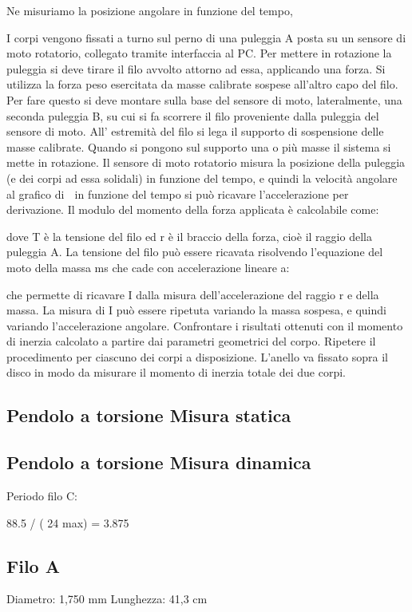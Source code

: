 \documentclass[a4paper,10pt]{report}
\begin{document}
Ne misuriamo la posizione angolare in funzione del tempo, 

I corpi vengono fissati a turno sul perno di una puleggia A posta su un sensore di moto rotatorio, collegato tramite interfaccia al PC. Per mettere in rotazione la puleggia si deve tirare il filo avvolto attorno ad essa, applicando una forza. Si utilizza la forza peso esercitata da masse calibrate sospese all’altro capo del filo. Per fare questo si deve montare sulla base del sensore di moto, lateralmente, una seconda puleggia B, su cui si fa scorrere il filo proveniente dalla puleggia del sensore di moto. All’ estremità del filo si lega il supporto di sospensione delle masse calibrate.
Quando si pongono sul supporto una o più masse il sistema si mette in rotazione. Il sensore di moto rotatorio misura la posizione della puleggia (e dei corpi ad essa solidali) in funzione del tempo, e quindi la velocità angolare  al grafico di  in funzione del tempo si può ricavare l’accelerazione  per derivazione.
Il modulo del momento della forza applicata è calcolabile come:

dove T è la tensione del filo ed r è il braccio della forza, cioè il raggio della puleggia A. La tensione del filo può essere ricavata risolvendo l’equazione del moto della massa ms che cade con accelerazione lineare a:

che permette di ricavare I dalla misura dell’accelerazione  del raggio r e della massa. La misura di I può essere ripetuta variando la massa sospesa, e quindi variando l’accelerazione angolare. Confrontare i risultati ottenuti con il momento di inerzia calcolato a partire dai parametri geometrici del corpo.
Ripetere il procedimento per ciascuno dei corpi a disposizione. L’anello va fissato sopra il disco in modo da misurare il momento di inerzia totale dei due corpi.

\subsection{Pendolo a torsione Misura statica}

\subsection{Pendolo a torsione Misura dinamica}


Periodo filo C:

88.5 / ( 24 max) = 3.875 

\subsection{Filo A}
Diametro: 1,750 mm
Lunghezza: 41,3 cm
\end{document}
